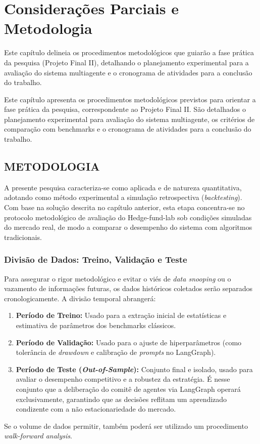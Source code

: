 \documentclass{eic-bcc-tcc}
\newcommand{\verify}[1]{{\color{blue} {#1}}}
\begin{document}
\chapter{Considerações Parciais e Metodologia}
\label{cha:resultados}

\verify{Este capítulo delineia os procedimentos metodológicos que guiarão a fase prática da pesquisa (Projeto Final II), detalhando o planejamento experimental para a avaliação do sistema multiagente e o cronograma de atividades para a conclusão do trabalho.}

Este capítulo apresenta os procedimentos metodológicos previstos para orientar a fase prática da pesquisa, correspondente ao Projeto Final II. São detalhados o planejamento experimental para avaliação do sistema multiagente, os critérios de comparação com benchmarks e o cronograma de atividades para a conclusão do trabalho.

\section{METODOLOGIA}

A presente pesquisa caracteriza-se como aplicada e de natureza quantitativa, adotando como método experimental a simulação retrospectiva (\textit{backtesting}). Com base na solução descrita no capítulo anterior, esta etapa concentra-se no protocolo metodológico de avaliação do Hedge-fund-lab sob condições simuladas do mercado real, de modo a comparar o desempenho do sistema com algoritmos tradicionais.

\subsection{Divisão de Dados: Treino, Validação e Teste}
Para assegurar o rigor metodológico e evitar o viés de \textit{data snooping} ou o vazamento de informações futuras, os dados históricos coletados serão separados cronologicamente. A divisão temporal abrangerá:
\begin{enumerate}
    \item \textbf{Período de Treino:} Usado para a extração inicial de estatísticas e estimativa de parâmetros dos benchmarks clássicos.
    \item \textbf{Período de Validação:} Usado para o ajuste de hiperparâmetros (como tolerância de \textit{drawdown} e calibração de \textit{prompts} no LangGraph).
    \item \textbf{Período de Teste (\textit{Out-of-Sample}):} Conjunto final e isolado, usado para avaliar o desempenho competitivo e a robustez da estratégia. É nesse conjunto que a deliberação do comitê de agentes via LangGraph operará exclusivamente, garantindo que as decisões reflitam um aprendizado condizente com a não estacionariedade do mercado.
\end{enumerate}
\verify{Se o volume de dados permitir, também poderá ser utilizado um procedimento \textit{walk-forward analysis}.}
\end{document}
